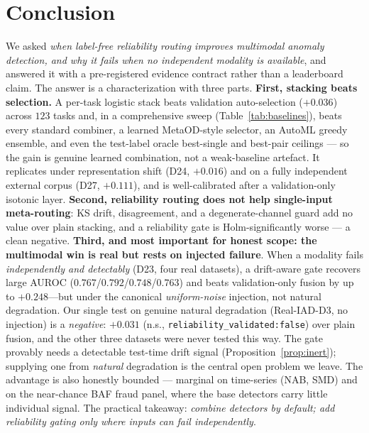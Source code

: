 \documentclass[10pt,conference]{IEEEtran}
\begin{document}
\section{Conclusion}
We asked \emph{when label-free reliability routing improves multimodal anomaly
detection, and why it fails when no independent modality is available}, and answered
it with a pre-registered evidence contract rather than a leaderboard claim. The
answer is a characterization with three parts. \textbf{First, stacking beats selection.} A per-task logistic stack beats
validation auto-selection ($+0.036$) across $123$ tasks and, in a comprehensive
sweep (Table~\ref{tab:baselines}), beats every standard combiner, a learned
MetaOD-style selector, an AutoML greedy ensemble, and even the test-label
oracle best-single and best-pair ceilings --- so the gain is genuine learned
combination, not a weak-baseline artefact. It replicates under representation shift
(D24, $+0.016$) and on a fully independent external corpus (D27, $+0.111$), and is
well-calibrated after a validation-only isotonic layer. \textbf{Second, reliability
routing does not help single-input meta-routing}: KS drift, disagreement, and a
degenerate-channel guard add no value over plain stacking, and a reliability gate is
Holm-significantly worse --- a clean negative. \textbf{Third, and most important for honest scope: the
multimodal win is real but rests on injected failure}. When a modality fails
\emph{independently and detectably} (D23, four real datasets), a drift-aware gate
recovers large AUROC ($0.767$/$0.792$/$0.748$/$0.763$) and beats validation-only
fusion by up to $+0.248$---but under the canonical \emph{uniform-noise} injection,
not natural degradation. Our single test on genuine natural degradation
(Real-IAD-D3, no injection) is a \emph{negative}: $+0.031$ (n.s.,
\texttt{reliability\_validated:false}) over plain fusion, and the other three datasets
were never tested this way. The gate provably needs a detectable test-time drift
signal (Proposition~\ref{prop:inert}); supplying one from \emph{natural} degradation
is the central open problem we leave. The advantage is
also honestly bounded --- marginal on time-series (NAB, SMD) and on the near-chance BAF
fraud panel, where the base detectors carry little individual signal. The practical
takeaway: \emph{combine detectors by default; add reliability gating only where
inputs can fail independently}.
\end{document}
